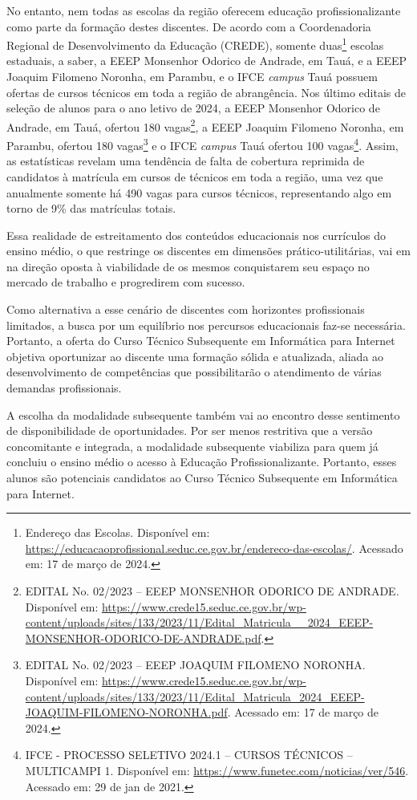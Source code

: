  No entanto, nem todas as escolas da região oferecem educação profissionalizante
 como parte da formação destes discentes. De acordo com a Coordenadoria Regional
 de Desenvolvimento da Educação (CREDE), somente duas\footnote{Endereço das
 Escolas. Disponível em:
 \url{https://educacaoprofissional.seduc.ce.gov.br/endereco-das-escolas/}.
 Acessado em: 17 de março de 2024.} escolas estaduais, a saber, a EEEP Monsenhor
 Odorico de Andrade, em Tauá, e a EEEP Joaquim Filomeno Noronha, em Parambu, e o
 IFCE \textit{campus} Tauá possuem ofertas de cursos técnicos em toda a região
 de abrangência. Nos último editais de seleção de alunos para o ano letivo de
 2024, a EEEP Monsenhor Odorico de Andrade, em Tauá, ofertou 180
 vagas\footnote{EDITAL No. 02/2023 – EEEP MONSENHOR ODORICO DE ANDRADE.
 Disponível em:
 \url{https://www.crede15.seduc.ce.gov.br/wp-content/uploads/sites/133/2023/11/Edital_Matricula__2024_EEEP-MONSENHOR-ODORICO-DE-ANDRADE.pdf}.},
 a EEEP Joaquim Filomeno Noronha, em Parambu, ofertou 180 vagas\footnote{EDITAL
 No. 02/2023 – EEEP JOAQUIM FILOMENO NORONHA. Disponível em:
 \url{https://www.crede15.seduc.ce.gov.br/wp-content/uploads/sites/133/2023/11/Edital_Matricula_2024_EEEP-JOAQUIM-FILOMENO-NORONHA.pdf}.
 Acessado em: 17 de março de 2024.} e o IFCE \textit{campus} Tauá ofertou 100
 vagas\footnote{IFCE - PROCESSO SELETIVO 2024.1 – CURSOS TÉCNICOS – MULTICAMPI
 1. Disponível em:
 \url{https://www.funetec.com/noticias/ver/546}. Acessado em: 29 de jan de
 2021.}. Assim, as estatísticas revelam uma tendência de falta de cobertura
 reprimida de candidatos à matrícula em cursos de técnicos em toda a região, uma
 vez que anualmente somente há 490 vagas para cursos técnicos, representando
 algo em torno de 9\% das matrículas totais.
 
 Essa realidade de estreitamento dos conteúdos educacionais nos currículos do
 ensino médio, o que restringe os discentes em dimensões prático-utilitárias,
 vai em na direção oposta \`a viabilidade de os mesmos conquistarem seu espaço
 no mercado de trabalho e progredirem com sucesso.
 
 Como alternativa a esse cenário de discentes com horizontes profissionais
 limitados, a busca por um equilíbrio nos percursos educacionais  faz-se
 necessária. Portanto, a oferta do Curso Técnico Subsequente em Informática para
 Internet objetiva oportunizar ao discente uma formação sólida e atualizada,
 aliada ao desenvolvimento de competências que possibilitarão o atendimento de
 várias demandas profissionais.
 
A escolha da modalidade subsequente também vai ao encontro desse sentimento de
disponibilidade de oportunidades. Por ser menos restritiva que a versão
concomitante e integrada, a modalidade subsequente viabiliza para quem já
concluiu o ensino médio o acesso à Educação Profissionalizante. Portanto, esses
alunos são potenciais candidatos ao Curso Técnico Subsequente em Informática
para Internet.


